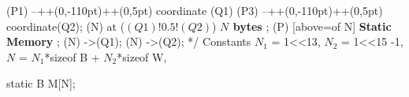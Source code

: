 \documentclass[12pt]{article}
\newenvironment{layout}{\quote\tikzpicture[start chain=going right,x=13pt,y=13pt]\scriptsize}
                       {\endtikzpicture\endquote}
\begin{document}
\begin{code}[literate=
    {*}{$\times$}{1}
    {=}{$\equiv$ }{1}{*}{$\times$}{1}
    {1<<13}{$2^{13}$}{3}
    {1<<15}{$2^{15}$}{3}
    {1a<<$H_x$}{$2^{H_x}$}{3}
]
\begin{layout}
 (P1) --++(0,-110pt)++(0,5pt) coordinate (Q1) (P3) --++(0,-110pt)++(0,5pt) coordinate(Q2);
\node (N) at ($(Q1)!0.5!(Q2)$) {\tiny\bf $N$ bytes };
\node (P) [above=of N] {\bf\scriptsize Static Memory} ;
\draw[m]  (N) ->(Q1);
\draw[m] (N) ->(Q2);
\end{layout}
*/ 
Constants {
    $N_1$ = 1<<13,
    $N_2$ = 1<<15 -1,    
    $N$ = $N_1$*sizeof B + $N_2$*sizeof W,    
}

static B M[N]; 
\end{code}
\end{document}
